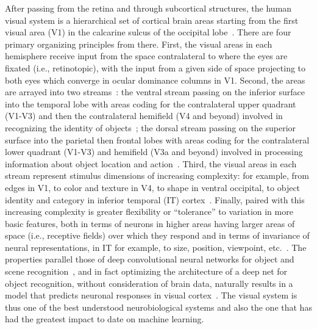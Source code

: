 After passing from the retina and through subcortical structures, the
human visual system is a hierarchical set of cortical brain areas
starting from the first visual area (V1) in the calcarine sulcus of
the occipital lobe~\citep{Felleman:1991}. There are four primary
organizing principles from there. First, the visual areas in each
hemisphere receive input from the space contralateral to where the
eyes are fixated (i.e., retinotopic), with the input from a given side
of space projecting to both eyes which converge in ocular dominance
columns in V1. Second, the areas are arrayed into two
streams~\citep{Mishkin:1983,Goodale:1992}: the ventral stream passing
on the inferior surface into the temporal lobe with areas coding for
the contralateral upper quadrant (V1-V3) and then the contralateral
hemifield (V4 and beyond) involved in recognizing the identity of
objects~\citep{Arcaro:2009}; the dorsal stream passing on the superior
surface into the parietal then frontal lobes with areas coding for the
contralateral lower quadrant (V1-V3) and hemifield (V3a and beyond)
involved in processing information about object location and
action~\citep{Konen:2008}. Third, the visual areas in each stream
represent stimulus dimensions of increasing complexity: for example,
from edges in V1, to color and texture in V4, to shape in ventral
occipital, to object identity and category in inferior temporal (IT)
cortex~\citep{Grill-Spector:2003,Rousselet:2004}. Finally, paired with
this increasing complexity is greater flexibility or ``tolerance'' to
variation in more basic features, both in terms of neurons in higher
areas having larger areas of space (i.e., receptive fields) over which
they respond and in terms of invariance of neural representations, in
IT for example, to size, position, viewpoint, etc.~\citep{Rust:2010}.
The properties parallel those of deep convolutional neural networks
for object and scene recognition~\citep{Kriegeskorte:2015}, and in
fact optimizing the architecture of a deep net for object
recognition, without consideration of brain data, naturally
results in a model that predicts neuronal responses in visual
cortex~\citep{Yamins:2016}. The visual system is thus one of the best
understood neurobiological systems and also the one that has had the
greatest impact to date on machine learning.

